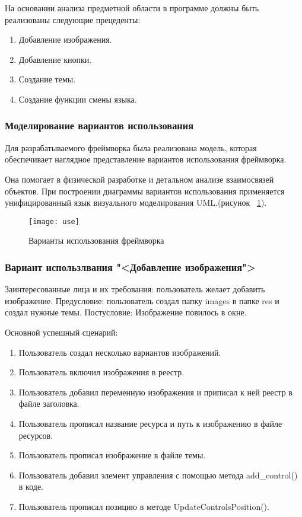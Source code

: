 На основании анализа предметной области в программе должны быть реализованы следующие прецеденты:
\begin{enumerate}
	\item Добавление изображения.
	\item Добавление кнопки.
	\item Создание темы.
	\item Создание функции смены языка.
\end{enumerate}

\subsubsection{Моделирование вариантов использования}

Для разрабатываемого фреймворка была реализована модель, которая обеспечивает наглядное представление вариантов использования фреймворка.

Она помогает в физической разработке и детальном анализе взаимосвязей объектов. При построении диаграммы вариантов использования применяется унифицированный язык визуального моделирования UML\cite{uml}.(рисунок ~\ref{use:image}).

\begin{figure}[ht]
	\texttt{[image: use]}
	\caption{Варианты использования фреймворка}
	\label{use:image}
\end{figure}

\subsubsection{Вариант использлвания "<Добавление изображения">}
Заинтересованные лица и их требования: пользователь желает добавить изображение.
Предусловие: пользователь создал папку images в папке res и создал нужные темы.
Постусловие: Изображение повилось в окне.

Основной успешный сценарий:
\begin{enumerate}
	\item Пользователь создал несколько вариантов изображений.
	\item Пользователь включил изображения в реестр.
	\item Пользователь добавил переменную изображения и приписал к ней реестр в файле заголовка.
	\item Пользователь прописал название ресурса и путь к изображению в файле ресурсов.
	\item Пользователь прописал изображение в файле темы.
	\item Пользователь добавил элемент управления с помощью метода add{\_}control() в коде.
	\item Пользователь прописал позицию в методе UpdateControlsPosition().
\end{enumerate}

